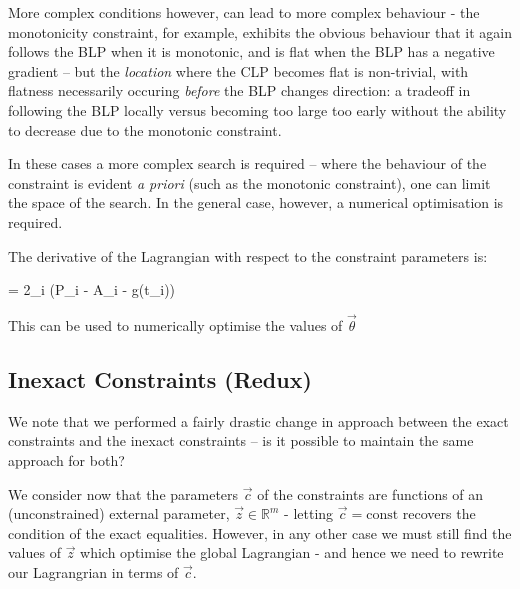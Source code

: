 \documentclass[]{article}
\begin{document}
			More complex conditions however, can lead to more complex behaviour - the monotonicity constraint, for example, exhibits the obvious behaviour that it again follows the BLP when it is monotonic, and is flat when the BLP has a negative gradient -- but the \textit{location} where the CLP becomes flat is non-trivial, with flatness necessarily occuring \textit{before} the BLP changes direction: a tradeoff in following the BLP locally versus becoming too large too early without the ability to decrease due to the monotonic constraint.

			In these cases a more complex search is required -- where the behaviour of the constraint is evident \textit{a priori} (such as the monotonic constraint), one can limit the space of the search. In the general case, however, a numerical optimisation is required. 

			The derivative of the Lagrangian with respect to the constraint parameters is:
			\begin{spalign}
				 = 2\sum_i \left(P_i - A_i - g(t_i)\right) 
			\end{spalign}
			This can be used to numerically optimise the values of $\vec{\theta}$

		\subsection{Inexact Constraints (Redux)}
			
			We note that we performed a fairly drastic change in approach between the exact constraints and the inexact constraints -- is it possible to maintain the same approach for both?

			We consider now that the parameters $\vec{c}$ of the constraints are functions of an (unconstrained) external parameter, $\vec{z} \in \mathbb{R}^m$ - letting $\vec{c} = \text{const}$ recovers the condition of the exact equalities. However, in any  other case we must still find the values of $\vec{z}$ which optimise the global Lagrangian - and hence we need to rewrite our Lagrangrian in terms of $\vec{c}$.
\end{document}
